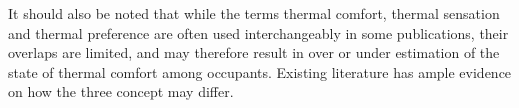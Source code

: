 It should also be noted that while the terms thermal comfort, thermal sensation and thermal preference are often used interchangeably in some publications, their overlaps are limited, and may therefore result in over or under estimation of the state of thermal comfort among occupants. Existing literature has ample evidence on how the three concept may differ. 




